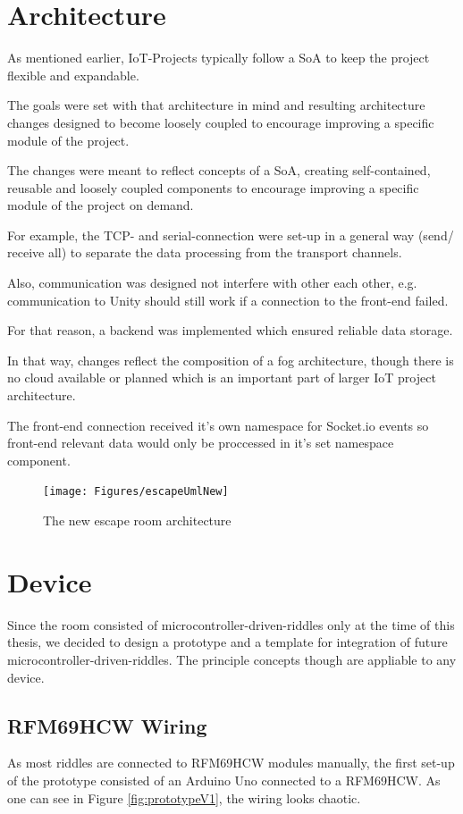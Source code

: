 \section{Architecture}

As mentioned earlier, IoT-Projects typically follow a SoA %
to keep the project flexible and expandable.

The goals were set with that architecture in mind and resulting architecture changes
designed to become loosely coupled to encourage improving a specific module of the project.

The changes were meant to reflect concepts of a SoA, creating self-contained,  
reusable and loosely coupled components
to encourage improving a specific module of the project on demand.

For example, the TCP- and serial-connection were set-up in a general way (send/ receive all) 
to separate the data processing from the transport channels. 

Also, communication was designed not interfere with other each other, e.g. 
communication to Unity should still work if a connection to the front-end failed.

For that reason, a backend was implemented which ensured reliable data storage.

In that way, changes reflect the composition of a fog architecture, 
though there is no cloud available or planned which is an important part 
of larger IoT project architecture.

The front-end connection received it's own namespace for Socket.io events so front-end relevant data
would only be proccessed in it's set namespace component.

\begin{figure}
	\centering
	\texttt{[image: Figures/escapeUmlNew]}
	\caption{The new escape room architecture}
	\label{fig:newEscapeUml}
\end{figure}

\section{Device}
Since the room consisted of microcontroller-driven-riddles only at the time of this thesis, 
we decided to design a prototype and a template for integration of future microcontroller-driven-riddles.
The principle concepts though are appliable to any device.

\subsection{RFM69HCW Wiring}
As most riddles are connected to RFM69HCW modules manually, the first set-up of the prototype 
consisted of an Arduino Uno connected to a RFM69HCW. As one can see in Figure \ref{fig:prototypeV1},
the wiring looks chaotic.



